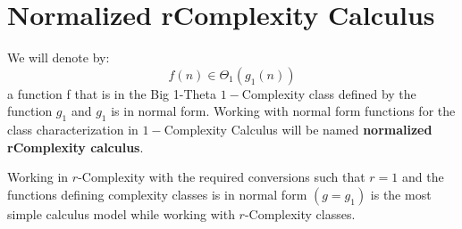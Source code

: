 \section{Normalized rComplexity Calculus}
\begin{definition}
We will denote by: 
\[ f(n) \in \Theta_{1}(g_{1}(n)) \]
a function f that is in the Big 1-Theta $1-$Complexity class defined by the function $g_{1}$ and $g_{1}$ is in normal form. Working with normal form functions for the class characterization in $1-$Complexity Calculus will be named \textbf{normalized rComplexity calculus}.
\end{definition}

\begin{remark}
Working in $r$-Complexity with the required conversions such that $r = 1$ and the functions defining complexity classes is in normal form $(g = g_{1})$ is the most simple
calculus model while working with $r$-Complexity classes.
\end{remark}
